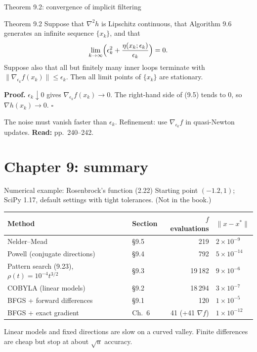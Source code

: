 \documentclass[12pt,aspectratio=169]{beamer}
\newcommand{\readpp}[1]{{\color{red!80!black}\textbf{Read:} #1}}
\newcommand{\eps}{\epsilon}
\begin{document}
\begin{frame}{Theorem 9.2: convergence of implicit filtering}
  \begin{block}{Theorem 9.2}
    Suppose that $\nabla^2h$ is Lipschitz continuous, that Algorithm 9.6 generates an infinite sequence $\{x_k\}$, and that
    \[
      \lim_{k\to\infty}\Bigl(\eps_k^2+\frac{\eta(x_k;\eps_k)}{\eps_k}\Bigr) = 0.
    \]
    Suppose also that all but finitely many inner loops terminate with $\|\nabla_{\eps_k}f(x_k)\|\le\eps_k$.
    Then all limit points of $\{x_k\}$ are stationary.
  \end{block}
  \textbf{Proof.} $\eps_k\downarrow0$ gives $\nabla_{\eps_k}f(x_k)\to0$.
  The right-hand side of (9.5) tends to 0, so $\nabla h(x_k)\to0$. \hfill$\square$

  \vspace{1ex}
  The noise must vanish faster than $\eps_k$. Refinement: use $\nabla_{\eps_k}f$ in quasi-Newton updates.
  \readpp{pp.~240--242.}
\end{frame}

\section{Chapter 9: summary}

\begin{frame}{Numerical example: Rosenbrock's function (2.22)}
  Starting point $(-1.2,1)$; SciPy 1.17, default settings with tight tolerances. (Not in the book.)

  \vspace{1ex}
  \centering
  \renewcommand{\arraystretch}{1.1}
  \begin{tabular}{llrl}
    \toprule
    Method & Section & $f$ evaluations & $\|x-x^*\|$\\
    \midrule
    Nelder--Mead & \S9.5 & 219 & $2\times10^{-9}$\\
    Powell (conjugate directions) & \S9.4 & 792 & $5\times10^{-14}$\\
    Pattern search (9.23), $\rho(t)=10^{-4}t^{3/2}$ & \S9.3 & 19\,182 & $9\times10^{-6}$\\
    COBYLA (linear models) & \S9.2 & 18\,294 & $3\times10^{-7}$\\
    BFGS + forward differences & \S9.1 & 120 & $1\times10^{-5}$\\
    BFGS + exact gradient & Ch.~6 & 41 (+41 $\nabla f$) & $1\times10^{-12}$\\
    \bottomrule
  \end{tabular}

  \vspace{1ex}
  \raggedright
  Linear models and fixed directions are slow on a curved valley. Finite differences are cheap
  but stop at about $\sqrt u$ accuracy.
\end{frame}
\end{document}
